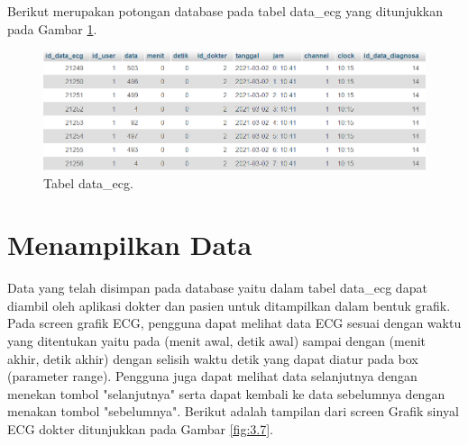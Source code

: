 Berikut merupakan potongan database pada tabel data\_ecg yang ditunjukkan pada Gambar  \ref{fig:3.6}.

\begin{figure}[H] \centering
	\includegraphics[width=1\textwidth]{img/tabel data ecg.png}
	\caption{Tabel data\_ecg.}
	\label{fig:3.6}
\end{figure}

\vspace{1ex} 
\section{Menampilkan Data}
\vspace{1ex}

Data yang telah disimpan pada database yaitu dalam tabel data\_ecg dapat diambil oleh aplikasi dokter dan pasien untuk ditampilkan dalam bentuk grafik. Pada screen grafik ECG, pengguna dapat melihat data ECG sesuai dengan waktu yang ditentukan yaitu pada (menit awal, detik awal) sampai dengan (menit akhir, detik akhir) dengan selisih waktu detik yang dapat diatur pada box (parameter range). Pengguna juga dapat melihat data selanjutnya dengan menekan tombol "selanjutnya" serta dapat kembali ke data sebelumnya dengan menakan tombol "sebelumnya". Berikut adalah tampilan dari screen Grafik sinyal ECG dokter ditunjukkan pada Gambar \ref{fig:3.7}. 

